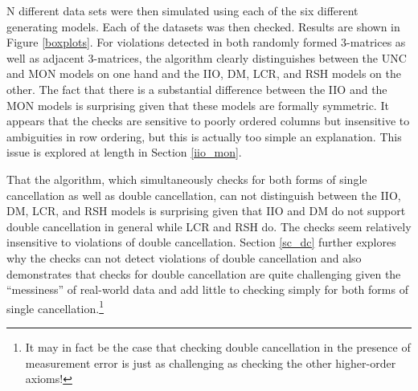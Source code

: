 \documentclass[12pt]{article}
\begin{document}
N different data sets were then simulated using each of the six different generating models. Each of the datasets was then checked. Results are shown in Figure \ref{boxplots}. For violations detected in both randomly formed 3-matrices as well as adjacent 3-matrices, the algorithm clearly distinguishes between the UNC and MON models on one hand and the IIO, DM, LCR, and RSH models on the other. The fact that there is a substantial difference between the IIO and the MON models is surprising given that these models are formally symmetric. It appears that the checks are sensitive to poorly ordered columns but insensitive to ambiguities in row ordering, but this is actually too simple an explanation. This issue is explored at length in Section \ref{iio_mon}.

That the algorithm, which simultaneously checks for both forms of single cancellation as well as double cancellation, can not distinguish between the IIO, DM, LCR, and RSH models is surprising given that IIO and DM do not support double cancellation in general while LCR and RSH do. The checks seem relatively insensitive to violations of double cancellation. Section \ref{sc_dc} further explores why the checks can not detect violations of double cancellation and also demonstrates that checks for double cancellation are quite challenging given the ``messiness'' of real-world data and add little to checking simply for both forms of single cancellation.\footnote{It may in fact be the case that checking double cancellation in the presence of measurement error is just as challenging as checking the other higher-order axioms!} 
\end{document}
